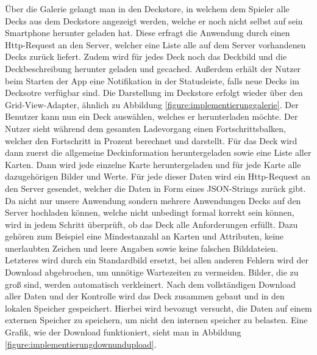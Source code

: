Über die Galerie gelangt man in den Deckstore, in welchem dem Spieler alle Decks aus dem Deckstore angezeigt werden, welche er noch nicht selbst auf sein Smartphone herunter geladen hat. Diese erfragt die Anwendung durch einen Http-Request an den Server, welcher eine Liste alle auf dem Server vorhandenen Decks zurück liefert. Zudem wird für jedes Deck noch das Deckbild und die Deckbeschreibung herunter geladen und gecached. Außerdem erhält der Nutzer beim Starten der App eine Notifikation in der Statusleiste, falls neue Decks im Decksotre verfügbar sind. Die Darstellung im Deckstore erfolgt wieder über den Grid-View-Adapter, ähnlich zu Abbildung \ref{figure:implementierunggalerie}. Der Benutzer kann nun ein Deck auswählen, welches er herunterladen möchte. Der Nutzer sieht während dem gesamten Ladevorgang einen Fortschrittsbalken, welcher den Fortschritt in Prozent berechnet und darstellt. Für das Deck wird dann zuerst die allgemeine Deckinformation heruntergeladen sowie eine Liste aller Karten. Dann wird jede einzelne Karte heruntergeladen und für jede Karte alle dazugehörigen Bilder und Werte. Für jede dieser Daten wird ein Http-Request an den Server gesendet, welcher die Daten in Form eines JSON-Strings zurück gibt. Da nicht nur unsere Anwendung sondern mehrere Anwendungen Decks auf den Server hochladen können, welche nicht unbedingt formal korrekt sein können, wird in jedem Schritt überprüft, ob das Deck alle Anforderungen erfüllt. Dazu gehören zum Beispiel eine Mindestanzahl an Karten und Attributen, keine unerlaubten Zeichen und leere Angaben sowie keine falschen Bilddateien. Letzteres wird durch ein Standardbild ersetzt, bei allen anderen Fehlern wird der Download abgebrochen, um unnötige Wartezeiten zu vermeiden. Bilder, die zu groß sind, werden automatisch verkleinert. Nach dem vollständigen Download aller Daten und der Kontrolle wird das Deck zusammen gebaut und in den lokalen Speicher gespeichert. Hierbei wird bevozugt versucht, die Daten auf einem externen Speicher zu speichern, um nicht den internen speicher zu belasten. Eine Grafik, wie der Download funktioniert, sieht man in Abbildung \ref{figure:implementierungdownundupload}.

